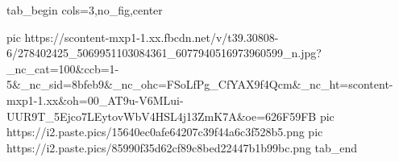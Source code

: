  
 
 
 
 

\ifcmt
  tab_begin cols=3,no_fig,center

     pic https://scontent-mxp1-1.xx.fbcdn.net/v/t39.30808-6/278402425_5069951103084361_6077940516973960599_n.jpg?_nc_cat=100&ccb=1-5&_nc_sid=8bfeb9&_nc_ohc=FSoLfPg_CfYAX9f4Qcm&_nc_ht=scontent-mxp1-1.xx&oh=00_AT9u-V6MLui-UUR9T_5Ejco7LEytovWbV4HSL4j13ZmK7A&oe=626F59FB
		 pic https://i2.paste.pics/15640ec0afe64207c39f44a6c3f528b5.png
		 pic https://i2.paste.pics/85990f35d62cf89c8bed22447b1b99bc.png
  tab_end
\fi
